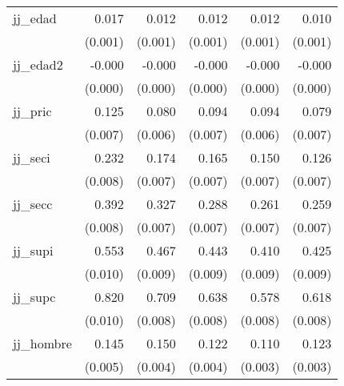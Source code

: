 {\begin{longtable}{l*{5}{D{.}{.}{-1}}}
\addlinespace
jj\_edad     &       0.017\sym{***}&       0.012\sym{***}&       0.012\sym{***}&       0.012\sym{***}&       0.010\sym{***}\\
            &     (0.001)         &     (0.001)         &     (0.001)         &     (0.001)         &     (0.001)         \\
\addlinespace
jj\_edad2    &      -0.000\sym{***}&      -0.000\sym{***}&      -0.000\sym{***}&      -0.000\sym{***}&      -0.000\sym{***}\\
            &     (0.000)         &     (0.000)         &     (0.000)         &     (0.000)         &     (0.000)         \\
\addlinespace
jj\_pric     &       0.125\sym{***}&       0.080\sym{***}&       0.094\sym{***}&       0.094\sym{***}&       0.079\sym{***}\\
            &     (0.007)         &     (0.006)         &     (0.007)         &     (0.006)         &     (0.007)         \\
\addlinespace
jj\_seci     &       0.232\sym{***}&       0.174\sym{***}&       0.165\sym{***}&       0.150\sym{***}&       0.126\sym{***}\\
            &     (0.008)         &     (0.007)         &     (0.007)         &     (0.007)         &     (0.007)         \\
\addlinespace
jj\_secc     &       0.392\sym{***}&       0.327\sym{***}&       0.288\sym{***}&       0.261\sym{***}&       0.259\sym{***}\\
            &     (0.008)         &     (0.007)         &     (0.007)         &     (0.007)         &     (0.007)         \\
\addlinespace
jj\_supi     &       0.553\sym{***}&       0.467\sym{***}&       0.443\sym{***}&       0.410\sym{***}&       0.425\sym{***}\\
            &     (0.010)         &     (0.009)         &     (0.009)         &     (0.009)         &     (0.009)         \\
\addlinespace
jj\_supc     &       0.820\sym{***}&       0.709\sym{***}&       0.638\sym{***}&       0.578\sym{***}&       0.618\sym{***}\\
            &     (0.010)         &     (0.008)         &     (0.008)         &     (0.008)         &     (0.008)         \\
\addlinespace
jj\_hombre   &       0.145\sym{***}&       0.150\sym{***}&       0.122\sym{***}&       0.110\sym{***}&       0.123\sym{***}\\
            &     (0.005)         &     (0.004)         &     (0.004)         &     (0.003)         &     (0.003)         \\

\end{longtable}}
